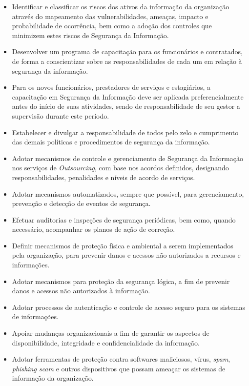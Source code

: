 \documentclass[a4paper,12pt]{article}
\begin{document}
\begin{itemize}
    \item Identificar e classificar os riscos dos ativos da informação da organização através do mapeamento das vulnerabilidades, ameaças, impacto e probabilidade de ocorrência, bem como a adoção dos controles que minimizem estes riscos de Segurança da Informação.
    \item Desenvolver um programa de capacitação para os funcionários e contratados, de forma a conscientizar sobre as responsabilidades de cada um em relação à segurança da informação.
    \item Para os novos funcionários, prestadores de serviços e estagiários, a capacitação em Segurança da Informação deve ser aplicada preferencialmente antes do início de suas atividades, sendo de responsabilidade de seu gestor a supervisão durante este período.
    \item Estabelecer e divulgar a responsabilidade de todos pelo zelo e cumprimento das demais políticas e procedimentos de segurança da informação.
    \item Adotar mecanismos de controle e gerenciamento de Segurança da Informação nos serviços de \textit{Outsourcing}, com base nos acordos definidos, designando responsabilidades, penalidades e níveis de acordo de serviços.
    \item Adotar mecanismos automatizados, sempre que possível, para gerenciamento, prevenção e detecção de eventos de segurança.
    \item Efetuar auditorias e inspeções de segurança periódicas, bem como, quando necessário, acompanhar os planos de ação de correção.
    \item Definir mecanismos de proteção física e ambiental a serem implementados pela organização, para prevenir danos e acessos não autorizados a recursos e informações.
    \item Adotar mecanismos para proteção da segurança lógica, a fim de prevenir danos e acessos não autorizados à informação.
    \item Adotar processos de autenticação e controle de acesso seguro para os sistemas de informações.
    \item Apoiar mudanças organizacionais a fim de garantir os aspectos de disponibilidade, integridade e confidencialidade da informação.
    \item Adotar ferramentas de proteção contra softwares maliciosos, vírus, \textit{spam}, \textit{phishing scam} e outros dispositivos que possam ameaçar os sistemas de informação da organização.

\end{itemize}
\end{document}
